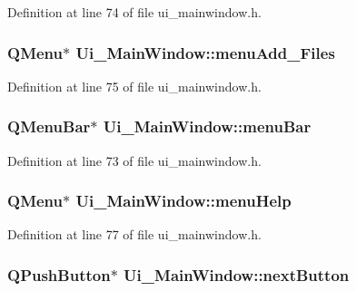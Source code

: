 Definition at line 74 of file ui\_\-mainwindow.h.

\hypertarget{classUi__MainWindow_a041df64e03e576dd5318db1d942f0c56}{
\subsubsection[{menuAdd\_\-Files}]{\setlength{\rightskip}{0pt plus 5cm}QMenu$\ast$ {\bf Ui\_\-MainWindow::menuAdd\_\-Files}}}
\label{classUi__MainWindow_a041df64e03e576dd5318db1d942f0c56}


Definition at line 75 of file ui\_\-mainwindow.h.

\hypertarget{classUi__MainWindow_a2be1c24ec9adfca18e1dcc951931457f}{
\subsubsection[{menuBar}]{\setlength{\rightskip}{0pt plus 5cm}QMenuBar$\ast$ {\bf Ui\_\-MainWindow::menuBar}}}
\label{classUi__MainWindow_a2be1c24ec9adfca18e1dcc951931457f}


Definition at line 73 of file ui\_\-mainwindow.h.

\hypertarget{classUi__MainWindow_ab95dbfbb0550206aeac76db36f491548}{
\subsubsection[{menuHelp}]{\setlength{\rightskip}{0pt plus 5cm}QMenu$\ast$ {\bf Ui\_\-MainWindow::menuHelp}}}
\label{classUi__MainWindow_ab95dbfbb0550206aeac76db36f491548}


Definition at line 77 of file ui\_\-mainwindow.h.

\hypertarget{classUi__MainWindow_ad2577b5dd34f235616d6afe36c225b27}{
\subsubsection[{nextButton}]{\setlength{\rightskip}{0pt plus 5cm}QPushButton$\ast$ {\bf Ui\_\-MainWindow::nextButton}}}
\label{classUi__MainWindow_ad2577b5dd34f235616d6afe36c225b27}


